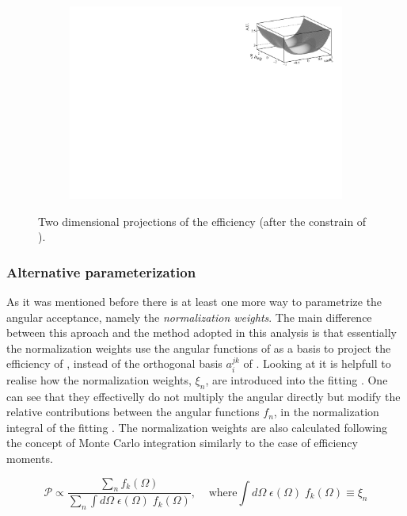 \begin{figure}[h]
\begin{subfigure}{0.5\textwidth}
    \includegraphics[width=\textwidth]{Figures/Chapter4/canv_cosThL_phi_Sim08_3fb_hel_negKaons_all.pdf}
    \caption{}
    \label{eff2D_lp}
  \end{subfigure}
\caption{Two dimensional projections of the efficiency (after the constrain of ).}
    \label{eff2D}
\end{figure}


\subsubsection{Alternative parameterization}
As it was mentioned before there is at least one more way to parametrize the angular acceptance, namely the \emph{normalization weights}.
The main difference between this aproach and the method adopted in this analysis is that essentially the normalization weights use the angular functions
of  as a basis to project the efficiency of , instead of the orthogonal basis $a_i^{jk}$ of .
Looking at  it is helpfull to realise how the normalization weights, $\xi_n$, are introduced into the fitting \pdf. 
One can see that they effectivelly do not multiply the angular \pdf directly but modify the relative contributions between the angular functions
$f_n$, in the normalization integral of the fitting \pdf. The normalization weights are also calculated following the concept of Monte Carlo integration
similarly to the case of efficiency moments.

\begin{equation}
  \mathcal{P} \propto \frac{\sum_n f_k(\Omega)}{\sum_n \int d\Omega \; \epsilon(\Omega) \; f_k(\Omega)}, \;\;\;\;\text{where} \int d\Omega \; \epsilon(\Omega) \; f_k(\Omega) \equiv \xi_n 
  \label{norm_weights_pdf}
\end{equation}

